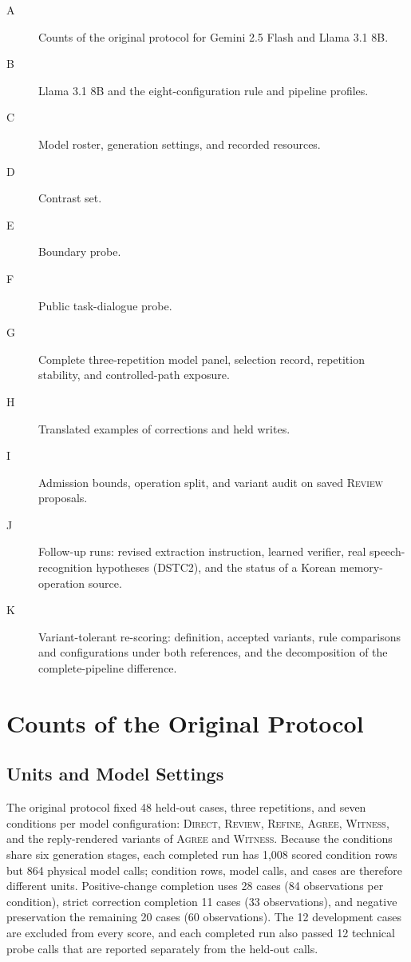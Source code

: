 \documentclass[acmsmall,review]{acmart}
\newcommand{\agree}{\textsc{Agree}}
\newcommand{\witness}{\textsc{Witness}}
\newcommand{\review}{\textsc{Review}}
\newcommand{\direct}{\textsc{Direct}}
\newcommand{\refine}{\textsc{Refine}}
\begin{document}
\begin{description}
\item[A] Counts of the original protocol for Gemini 2.5 Flash and Llama 3.1 8B.
\item[B] Llama 3.1 8B and the eight-configuration rule and pipeline profiles.
\item[C] Model roster, generation settings, and recorded resources.
\item[D] Contrast set.
\item[E] Boundary probe.
\item[F] Public task-dialogue probe.
\item[G] Complete three-repetition model panel, selection record, repetition stability, and controlled-path exposure.
\item[H] Translated examples of corrections and held writes.
\item[I] Admission bounds, operation split, and variant audit on saved \review{} proposals.
\item[J] Follow-up runs: revised extraction instruction, learned verifier, real speech-recognition hypotheses (DSTC2), and the status of a Korean memory-operation source.
\item[K] Variant-tolerant re-scoring: definition, accepted variants, rule comparisons and configurations under both references, and the decomposition of the complete-pipeline difference.
\end{description}

\appendix
\FloatBarrier
\setcounter{figure}{0}\setcounter{table}{0}
\renewcommand{\thefigure}{A\arabic{figure}}
\renewcommand{\thetable}{A\arabic{table}}
\section{Counts of the Original Protocol}
\subsection{Units and Model Settings}
The original protocol fixed 48 held-out cases, three repetitions, and seven conditions per model configuration: \direct{}, \review{}, \refine{}, \agree{}, \witness{}, and the reply-rendered variants of \agree{} and \witness{}. Because the conditions share six generation stages, each completed run has 1,008 scored condition rows but 864 physical model calls; condition rows, model calls, and cases are therefore different units. Positive-change completion uses 28 cases (84 observations per condition), strict correction completion 11 cases (33 observations), and negative preservation the remaining 20 cases (60 observations). The 12 development cases are excluded from every score, and each completed run also passed 12 technical probe calls that are reported separately from the held-out calls.
\end{document}
